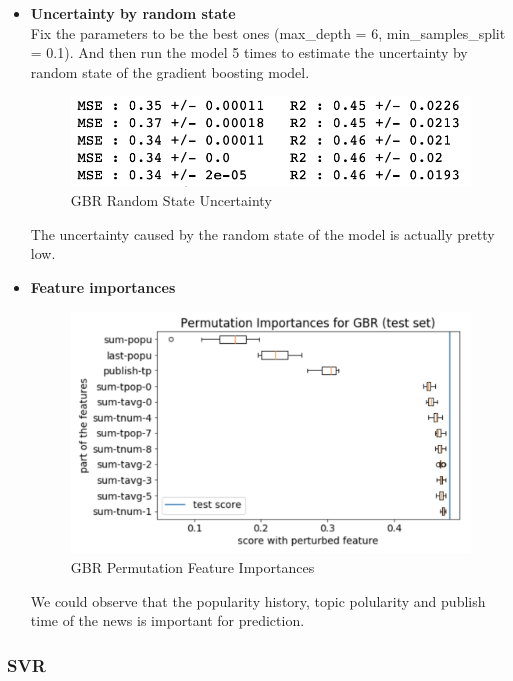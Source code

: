 \documentclass{article}
\begin{document}
\begin{itemize}
\item \textbf{Uncertainty by random state}\\
Fix the parameters to be the best ones (max\_depth = 6, min\_samples\_split = 0.1). And then run the model 5 times to estimate the uncertainty by random state of the gradient boosting model. 
\begin{figure}[H]
\centering
\includegraphics[scale=0.5]{"gbr_rs_unc"}
\caption{GBR Random State Uncertainty}
\end{figure}
The uncertainty caused by the random state of the model is actually pretty low.
\item \textbf{Feature importances}
\begin{figure}[H]
\centering
\includegraphics[scale=0.5]{"gbr_perm_imp"}
\caption{GBR Permutation Feature Importances}
\end{figure}
We could observe that the popularity history, topic polularity and publish time of the news is important for prediction.
\end{itemize}



\subsubsection{SVR}
\end{document}
